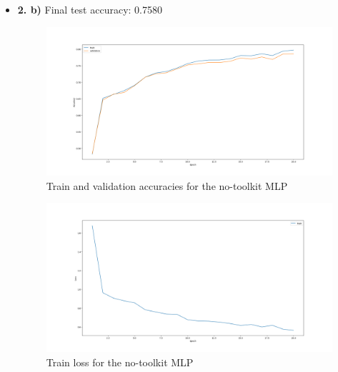\documentclass[12pt]{article}
\begin{document}
\begin{itemize}
    \item \textbf{2. b)} Final test accuracy: 0.7580
          \begin{figure}[H]
              \centering
              \includegraphics[width=1\linewidth]{../outputs/hw1-q1-2b.001-acc.png}
              \caption{Train and validation accuracies for the no-toolkit MLP}
              \label{fig:1.2b:acc}
          \end{figure}
          \begin{figure}[H]
              \centering
              \includegraphics[width=1\linewidth]{../outputs/hw1-q1-2b.001-loss.png}
              \caption{Train loss for the no-toolkit MLP}
              \label{fig:1.2b:loss}
          \end{figure}
\end{itemize}
\end{document}
